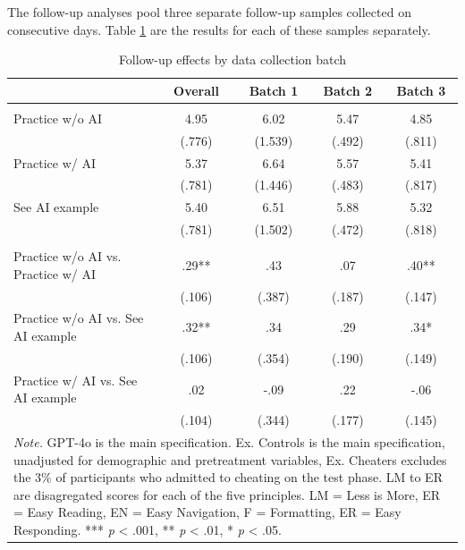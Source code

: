 \documentclass[11pt]{report}
\begin{document}
\begin{append}
The follow-up analyses pool three separate follow-up samples collected on consecutive days. Table \ref{tab:s3_followup_batches} are the results for each of these samples separately.

\begin{table}[ht]
    \centering
        \caption{Follow-up effects by data collection batch}

\begin{tabular}{lcccc}
\toprule
  & Overall & Batch 1 & Batch 2 & Batch 3 \\ 
\midrule\addlinespace[2.5pt]
\multicolumn{5}{l}{\textbf{Means --- (SE)}} \\ 
\midrule\addlinespace[2.5pt]
Practice w/o AI & 4.95 & 6.02 & 5.47 & 4.85 \\ 
 & (.776) & (1.539) & (.492) & (.811) \\ 
Practice w/ AI & 5.37 & 6.64 & 5.57 & 5.41 \\ 
 & (.781) & (1.446) & (.483) & (.817) \\ 
See AI example & 5.40 & 6.51 & 5.88 & 5.32 \\ 
 & (.781) & (1.502) & (.472) & (.818) \\ 
\midrule\addlinespace[2.5pt]
\multicolumn{5}{l}{\textbf{Effect Sizes (d) --- (SE)}} \\ 
\midrule\addlinespace[2.5pt]
Practice w/o AI vs. Practice w/ AI & .29** & .43 & .07 & .40** \\ 
 & (.106) & (.387) & (.187) & (.147) \\ 
Practice w/o AI vs. See AI example & .32** & .34 & .29 & .34* \\ 
 & (.106) & (.354) & (.190) & (.149) \\ 
Practice w/ AI vs. See AI example & .02 & -.09 & .22 & -.06 \\ 
 & (.104) & (.344) & (.177) & (.145) \\ 
\midrule
\multicolumn{5}{p{10cm}}{\textit{Note.} GPT-4o is the main specification. Ex. Controls is the main specification, unadjusted for demographic and pretreatment variables, Ex. Cheaters excludes the 3\% of participants who admitted to cheating on the test phase. LM to ER are disagregated scores for each of the five principles. LM = Less is More, ER = Easy Reading, EN = Easy Navigation, F = Formatting, ER = Easy Responding. *** \textit{p} < .001, ** \textit{p} < .01, * \textit{p} < .05.}
\vspace{5pt}
\end{tabular}
    \label{tab:s3_followup_batches}
\end{table}



\end{append}
\end{document}
